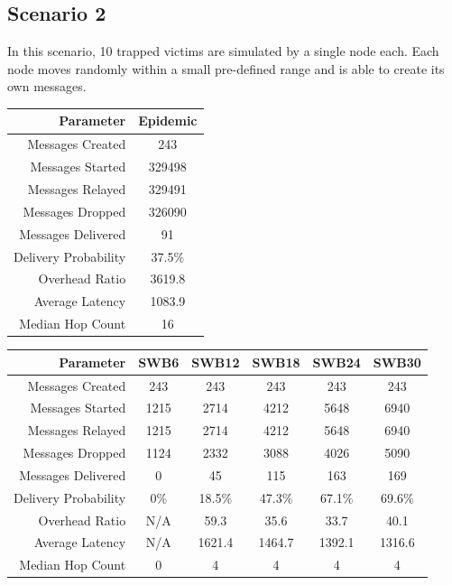 \documentclass{article}
\begin{document}
\restoregeometry

\clearpage

\subsection{Scenario 2}
In this scenario, 10 trapped victims are simulated by a single node each. Each node moves randomly within a small pre-defined range and is able to create its own messages.

\begin{center}
\begin{tabular}{|r|c|}
\hline
\textbf{Parameter} & \textbf{Epidemic} \\ \hline
Messages Created & 243 \\ \hline
Messages Started & 329498 \\ \hline
Messages Relayed & 329491 \\ \hline
Messages Dropped & 326090 \\ \hline
Messages Delivered & 91 \\ \hline
Delivery Probability & 37.5\%\\ \hline
Overhead Ratio & 3619.8 \\ \hline
Average Latency & 1083.9 \\ \hline
Median Hop Count & 16 \\ \hline
\end{tabular}
\end{center}

\begin{center}
\begin{tabular}{|r|c|c|c|c|c|}
\hline
\textbf{Parameter} & \textbf{SWB6} & \textbf{SWB12} & \textbf{SWB18} & \textbf{SWB24} & \textbf{SWB30} \\ \hline
Messages Created & 243 & 243 & 243 & 243 & 243 \\ \hline
Messages Started & 1215 & 2714 & 4212 & 5648 & 6940 \\ \hline
Messages Relayed & 1215 & 2714 & 4212 & 5648 & 6940 \\ \hline
Messages Dropped & 1124 & 2332 & 3088 & 4026 & 5090 \\ \hline
Messages Delivered & 0 & 45 & 115 & 163 & 169 \\ \hline
Delivery Probability & 0\% & 18.5\% & 47.3\% & 67.1\% & 69.6\% \\ \hline
Overhead Ratio & N/A & 59.3 & 35.6 & 33.7 & 40.1 \\ \hline
Average Latency & N/A & 1621.4 & 1464.7 & 1392.1 & 1316.6 \\ \hline
Median Hop Count & 0 & 4 & 4 & 4 & 4 \\ \hline
\end{tabular}
\end{center}
\end{document}
